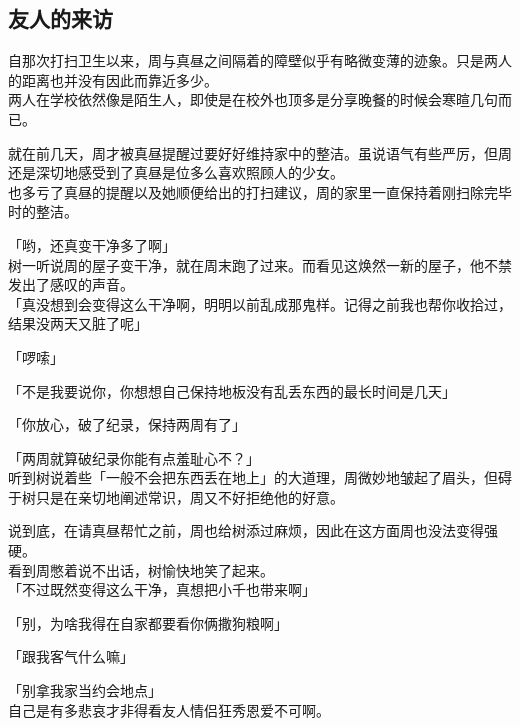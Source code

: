 \subsection{友人的来访}

自那次打扫卫生以来，周与真昼之间隔着的障壁似乎有略微变薄的迹象。只是两人的距离也并没有因此而靠近多少。\\

两人在学校依然像是陌生人，即使是在校外也顶多是分享晚餐的时候会寒暄几句而已。

就在前几天，周才被真昼提醒过要好好维持家中的整洁。虽说语气有些严厉，但周还是深切地感受到了真昼是位多么喜欢照顾人的少女。\\

也多亏了真昼的提醒以及她顺便给出的打扫建议，周的家里一直保持着刚扫除完毕时的整洁。\\

\vspace{2\baselineskip}

「哟，还真变干净多了啊」\\

树一听说周的屋子变干净，就在周末跑了过来。而看见这焕然一新的屋子，他不禁发出了感叹的声音。\\

「真没想到会变得这么干净啊，明明以前乱成那鬼样。记得之前我也帮你收拾过，结果没两天又脏了呢」

「啰嗦」

「不是我要说你，你想想自己保持地板没有乱丢东西的最长时间是几天」

「你放心，破了纪录，保持两周有了」

「两周就算破纪录你能有点羞耻心不？」\\

听到树说着些「一般不会把东西丢在地上」的大道理，周微妙地皱起了眉头，但碍于树只是在亲切地阐述常识，周又不好拒绝他的好意。

说到底，在请真昼帮忙之前，周也给树添过麻烦，因此在这方面周也没法变得强硬。\\

看到周憋着说不出话，树愉快地笑了起来。\\

「不过既然变得这么干净，真想把小千也带来啊」

「别，为啥我得在自家都要看你俩撒狗粮啊」

「跟我客气什么嘛」

「别拿我家当约会地点」\\

自己是有多悲哀才非得看友人情侣狂秀恩爱不可啊。

